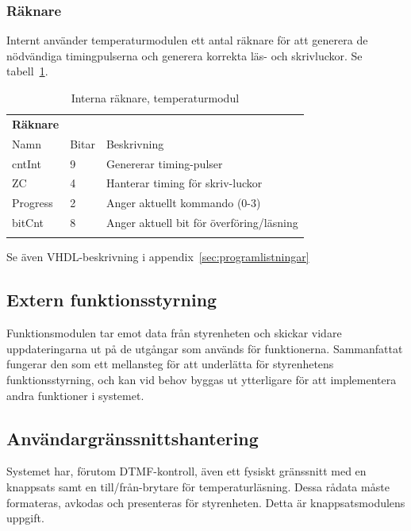 \documentclass[a4paper,11pt]{article}
\begin{document}
	\subsubsection{Räknare}
	
	Internt använder temperaturmodulen ett antal räknare för att generera de nödvändiga timingpulserna och generera korrekta läs- och skrivluckor. Se tabell~\ref{tab:cntTabell}.

	\begin{table} [H]
		
		\caption{Interna räknare, temperaturmodul} 
		\label{tab:cntTabell}
	\begin{tabular}{l l l}
		
		{\bf Räknare}
		\\{Namn} & {Bitar} & {Beskrivning}\\
		\hline
			cntInt & 9 & Genererar timing-pulser\\
			ZC & 4 & Hanterar timing för skriv-luckor\\
			Progress & 2 & Anger aktuellt kommando (0-3)\\
			bitCnt & 8 & Anger aktuell bit för överföring/läsning\\\\
	\end{tabular}
	\end{table}

	Se även VHDL-beskrivning i appendix~\ref{sec:programlistningar}

	\subsection{Extern funktionsstyrning}

Funktionsmodulen tar emot data från styrenheten och skickar vidare 
uppdateringarna ut på de utgångar som används för funktionerna. Sammanfattat fungerar den som ett
mellansteg för att underlätta för styrenhetens funktionsstyrning, och kan vid behov byggas ut ytterligare
för att implementera andra funktioner i systemet.

	\subsection{Användargränssnittshantering}

Systemet har, förutom DTMF-kontroll, även ett fysiskt gränssnitt med en knappsats samt en till/från-brytare för temperaturläsning.
Dessa rådata måste formateras, avkodas och presenteras för styrenheten. Detta är knappsatsmodulens uppgift.
\end{document}
